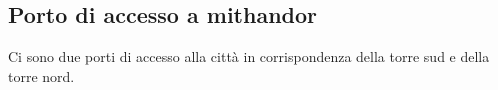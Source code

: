 \subsection{Porto di accesso a mithandor}
Ci sono due porti di accesso alla citt\`a in corrispondenza della torre sud e della torre nord.
